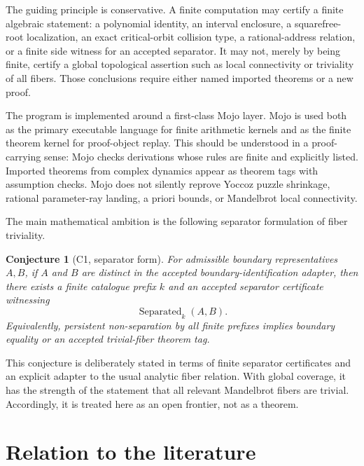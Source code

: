 \documentclass[11pt]{amsart}
\newtheorem{conjecture}[theorem]{Conjecture}
\begin{document}
The guiding principle is conservative.  A finite computation may certify a finite algebraic statement: a polynomial identity, an interval enclosure, a squarefree-root localization, an exact critical-orbit collision type, a rational-address relation, or a finite side witness for an accepted separator.  It may not, merely by being finite, certify a global topological assertion such as local connectivity or triviality of all fibers.  Those conclusions require either named imported theorems or a new proof.

The program is implemented around a first-class Mojo layer.  Mojo is used both as the primary executable language for finite arithmetic kernels and as the finite theorem kernel for proof-object replay.  This should be understood in a proof-carrying sense: Mojo checks derivations whose rules are finite and explicitly listed.  Imported theorems from complex dynamics appear as theorem tags with assumption checks.  Mojo does not silently reprove Yoccoz puzzle shrinkage, rational parameter-ray landing, a priori bounds, or Mandelbrot local connectivity.

The main mathematical ambition is the following separator formulation of fiber triviality.

\begin{conjecture}[C1, separator form]
For admissible boundary representatives \(A,B\), if \(A\) and \(B\) are distinct in the accepted boundary-identification adapter, then there exists a finite catalogue prefix \(k\) and an accepted separator certificate witnessing
\[
        \operatorname{Separated}_k(A,B).
\]
Equivalently, persistent non-separation by all finite prefixes implies boundary equality or an accepted trivial-fiber theorem tag.
\end{conjecture}

This conjecture is deliberately stated in terms of finite separator certificates and an explicit adapter to the usual analytic fiber relation.  With global coverage, it has the strength of the statement that all relevant Mandelbrot fibers are trivial.  Accordingly, it is treated here as an open frontier, not as a theorem.

\section{Relation to the literature}
\end{document}

